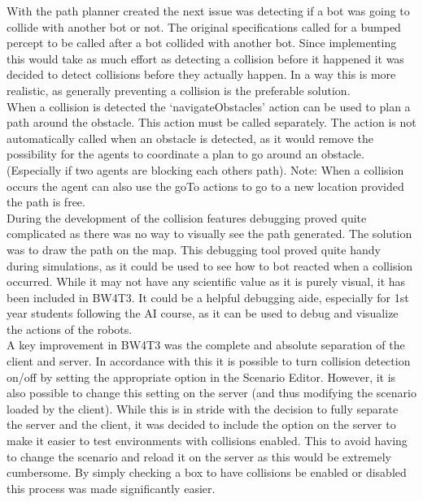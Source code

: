 With the path planner created the next issue was detecting if a bot was going to collide with another bot or not. The original specifications called for a bumped percept to be called after a bot collided with another bot. Since implementing this would take as much effort as detecting a collision before it happened it was decided to detect collisions before they actually happen. In a way this is more realistic, as generally preventing a collision is the preferable solution. \\

When a collision is detected the `navigateObstacles' action can be used to plan a path around the obstacle. This action must be called separately. The action is not automatically called when an obstacle is detected, as it would remove the possibility for the agents to coordinate a plan to go around an obstacle. (Especially if two agents are blocking each others path). Note: When a collision occurs the agent can also use the goTo actions to go to a new location provided the path is free. \\

During the development of the collision features debugging proved quite complicated as there was no way to visually see the path generated. The solution was to draw the path on the map. This debugging tool proved quite handy during simulations, as it could be used to see how to bot reacted when a collision occurred. While it may not have any scientific value as it is purely visual, it has been included in BW4T3. It could be a helpful debugging aide, especially for 1st year students following the AI course, as it can be used to debug and visualize the actions of the robots. \\

A key improvement in BW4T3 was the complete and absolute separation of the client and server. In accordance with this it is possible to turn collision detection on/off  by setting the appropriate option in the Scenario Editor. However, it is also possible to change this setting on the server (and thus modifying the scenario loaded by the client). While this is in stride with the decision to fully separate the server and the client, it was decided to include the option on the server to make it easier to test environments with collisions enabled. This to avoid having to change the scenario and reload it on the server as this would be extremely cumbersome. By simply checking a box to have collisions be enabled or disabled this process was made significantly easier.

